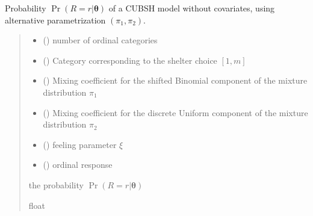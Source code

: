 \documentclass[letterpaper,10pt,english]{sphinxmanual}
\begin{document}

\begin{fulllineitems}
\label{\detokenize{cubmods:cubmods.cubsh.proba}}
\pysigstartsignatures
{}
\pysigstopsignatures
\sphinxAtStartPar
Probability \(\Pr(R = r | \pmb\theta)\) of a CUBSH model without covariates,
using alternative parametrization \((\pi_1, \pi_2)\).
\begin{quote}\begin{description}
\begin{itemize}
\item {} 
\sphinxAtStartPar
{} () \textendash{} number of ordinal categories

\item {} 
\sphinxAtStartPar
{} () \textendash{} Category corresponding to the shelter choice \([1,m]\)

\item {} 
\sphinxAtStartPar
{} () \textendash{} Mixing coefficient for the shifted Binomial component of the mixture distribution \(\pi_1\)

\item {} 
\sphinxAtStartPar
{} () \textendash{} Mixing coefficient for the discrete Uniform component of the mixture distribution \(\pi_2\)

\item {} 
\sphinxAtStartPar
{} () \textendash{} feeling parameter \(\xi\)

\item {} 
\sphinxAtStartPar
{} () \textendash{} ordinal response

\end{itemize}

\sphinxAtStartPar
the probability \(\Pr(R = r | \pmb\theta)\)

\sphinxAtStartPar
float

\end{description}\end{quote}

\end{fulllineitems}
\end{document}
